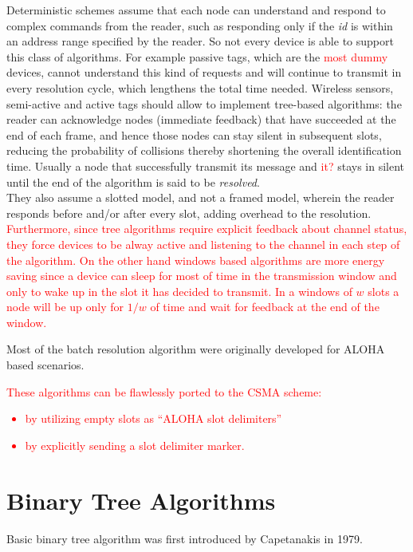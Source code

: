 \documentclass[12pt,a4paper,twocolumns]{report}
\begin{document}
Deterministic schemes assume that each node can understand and respond to complex commands from the reader, such as responding only if the \emph{id} is within an address range specified by the reader. So not every device is able to support this class of algorithms. For example passive tags, which are the \textcolor{red}{most dummy} devices, cannot understand this kind of requests and will continue to transmit in every resolution cycle, which lengthens the total time needed. Wireless sensors, semi-active and active tags should allow to implement tree-based algorithms: the reader can acknowledge nodes (immediate feedback) that have succeeded at the end of each frame, and hence those nodes can stay silent in subsequent slots, reducing the probability of collisions thereby shortening the overall identification time. Usually a node that successfully transmit its message and \textcolor{red}{it?} stays in silent until the end of the algorithm is said to be \emph{resolved}.\\
They also assume a slotted model, and not a framed model, wherein the reader responds before and/or after every slot, adding overhead to the resolution.\\
\textcolor{red}{
Furthermore, since tree algorithms require explicit feedback about channel status, they force devices to be alway active and listening to the channel in each step of the algorithm.
On the other hand windows based algorithms are more energy saving since a device can sleep for most of time in the transmission window and only to wake up in the slot it has decided to transmit. In a windows of $w$ slots  a node will be up only for $1/w$ of time and wait for feedback at the end of the window.}


Most of the batch resolution algorithm were originally developed for ALOHA based scenarios.\\
\textcolor{red}{
These algorithms can be flawlessly ported to the CSMA scheme:
\begin{itemize}
\item by utilizing empty slots as ``ALOHA slot delimiters''
\item by explicitly sending a slot delimiter marker.
\end{itemize}
} 
 
\section{Binary Tree Algorithms}
Basic binary tree algorithm was first introduced by Capetanakis  \cite{capetanakis} in 1979.
\end{document}
